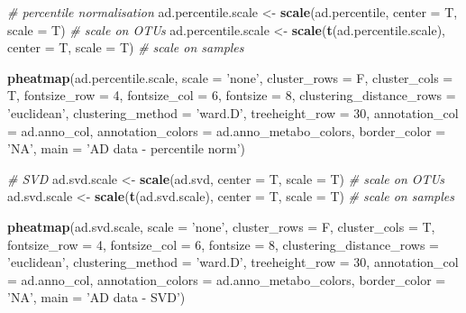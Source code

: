 \documentclass[]{book}
\newenvironment{Shaded}{\begin{snugshade}}{\end{snugshade}}
\newcommand{\KeywordTok}[1]{\textcolor[rgb]{0.13,0.29,0.53}{\textbf{#1}}}
\newcommand{\DataTypeTok}[1]{\textcolor[rgb]{0.13,0.29,0.53}{#1}}
\newcommand{\DecValTok}[1]{\textcolor[rgb]{0.00,0.00,0.81}{#1}}
\newcommand{\StringTok}[1]{\textcolor[rgb]{0.31,0.60,0.02}{#1}}
\newcommand{\CommentTok}[1]{\textcolor[rgb]{0.56,0.35,0.01}{\textit{#1}}}
\newcommand{\NormalTok}[1]{#1}
\begin{document}
\begin{Shaded}
\begin{Highlighting}[]
\CommentTok{# percentile normalisation}
\NormalTok{ad.percentile.scale <-}\StringTok{ }\KeywordTok{scale}\NormalTok{(ad.percentile, }\DataTypeTok{center =}\NormalTok{ T, }\DataTypeTok{scale =}\NormalTok{ T) }\CommentTok{# scale on OTUs}
\NormalTok{ad.percentile.scale <-}\StringTok{ }\KeywordTok{scale}\NormalTok{(}\KeywordTok{t}\NormalTok{(ad.percentile.scale), }\DataTypeTok{center =}\NormalTok{ T, }\DataTypeTok{scale =}\NormalTok{ T) }\CommentTok{# scale on samples}

\KeywordTok{pheatmap}\NormalTok{(ad.percentile.scale, }
         \DataTypeTok{scale =} \StringTok{'none'}\NormalTok{, }
         \DataTypeTok{cluster_rows =}\NormalTok{ F, }
         \DataTypeTok{cluster_cols =}\NormalTok{ T, }
         \DataTypeTok{fontsize_row =} \DecValTok{4}\NormalTok{, }\DataTypeTok{fontsize_col =} \DecValTok{6}\NormalTok{,}
         \DataTypeTok{fontsize =} \DecValTok{8}\NormalTok{,}
         \DataTypeTok{clustering_distance_rows =} \StringTok{'euclidean'}\NormalTok{,}
         \DataTypeTok{clustering_method =} \StringTok{'ward.D'}\NormalTok{,}
         \DataTypeTok{treeheight_row =} \DecValTok{30}\NormalTok{,}
         \DataTypeTok{annotation_col =}\NormalTok{ ad.anno_col,}
         \DataTypeTok{annotation_colors =}\NormalTok{ ad.anno_metabo_colors,}
         \DataTypeTok{border_color =} \StringTok{'NA'}\NormalTok{,}
         \DataTypeTok{main =} \StringTok{'AD data - percentile norm'}\NormalTok{)}

\CommentTok{# SVD}
\NormalTok{ad.svd.scale <-}\StringTok{ }\KeywordTok{scale}\NormalTok{(ad.svd, }\DataTypeTok{center =}\NormalTok{ T, }\DataTypeTok{scale =}\NormalTok{ T) }\CommentTok{# scale on OTUs}
\NormalTok{ad.svd.scale <-}\StringTok{ }\KeywordTok{scale}\NormalTok{(}\KeywordTok{t}\NormalTok{(ad.svd.scale), }\DataTypeTok{center =}\NormalTok{ T, }\DataTypeTok{scale =}\NormalTok{ T) }\CommentTok{# scale on samples}

\KeywordTok{pheatmap}\NormalTok{(ad.svd.scale, }
         \DataTypeTok{scale =} \StringTok{'none'}\NormalTok{, }
         \DataTypeTok{cluster_rows =}\NormalTok{ F, }
         \DataTypeTok{cluster_cols =}\NormalTok{ T, }
         \DataTypeTok{fontsize_row =} \DecValTok{4}\NormalTok{, }\DataTypeTok{fontsize_col =} \DecValTok{6}\NormalTok{,}
         \DataTypeTok{fontsize =} \DecValTok{8}\NormalTok{,}
         \DataTypeTok{clustering_distance_rows =} \StringTok{'euclidean'}\NormalTok{,}
         \DataTypeTok{clustering_method =} \StringTok{'ward.D'}\NormalTok{,}
         \DataTypeTok{treeheight_row =} \DecValTok{30}\NormalTok{,}
         \DataTypeTok{annotation_col =}\NormalTok{ ad.anno_col,}
         \DataTypeTok{annotation_colors =}\NormalTok{ ad.anno_metabo_colors,}
         \DataTypeTok{border_color =} \StringTok{'NA'}\NormalTok{,}
         \DataTypeTok{main =} \StringTok{'AD data - SVD'}\NormalTok{)}



\end{Highlighting}
\end{Shaded}
\end{document}
